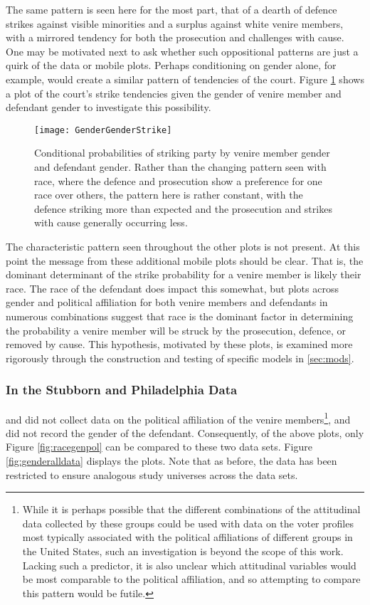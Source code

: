 The same pattern is seen here for the most part, that of a dearth of defence strikes against visible minorities and a surplus
against white venire members, with a mirrored tendency for both the prosecution and challenges with cause. One may be motivated
next to ask whether such oppositional patterns are just a quirk of the data or mobile plots. Perhaps conditioning on gender
alone, for example, would create a similar pattern of tendencies of the court. Figure \ref{fig:gengen} shows a plot of the court's
strike tendencies given the gender of venire member and defendant gender to investigate this possibility.

\begin{figure}[h!]
  \centering
  \texttt{[image: GenderGenderStrike]}
  \caption[Strikes by Gender and Defendant Gender (Sunshine)]
  {\footnotesize Conditional probabilities of striking party by venire member gender and defendant gender. Rather than the changing
    pattern seen with race, where the defence and prosecution show a preference for one race over others, the pattern here is
    rather constant, with the defence striking more than expected and
    the prosecution and strikes with cause generally occurring
    less.} \label{fig:gengen}
\end{figure}

The characteristic pattern seen throughout the other plots is not present. At this point the message from these additional mobile
plots should be clear. That is, the dominant determinant of the strike probability for a venire member is likely their race. The
race of the defendant does impact this somewhat, but plots across gender and political affiliation for both venire members and
defendants in numerous combinations suggest that race is the dominant factor in determining the probability a venire member will
be struck by the prosecution, defence, or removed by cause. This hypothesis, motivated by these plots, is examined more rigorously
through the construction and testing of specific models in \ref{sec:mods}.

\subsubsection{In the Stubborn and Philadelphia Data}

\cite{StubbornLegacy} and \cite{PerempChalMurder} did not collect data on the political affiliation of the venire
members\footnote{While it is perhaps possible that the different combinations of the attitudinal data collected by these groups
  could be used with data on the voter profiles most typically associated with the political affiliations of different groups in
  the United States, such an investigation is beyond the scope of this work. Lacking such a predictor, it is also unclear which
  attitudinal variables would be most comparable to the political affiliation, and so attempting to compare this pattern would be
  futile.}, and \cite{StubbornLegacy} did not record the gender of the defendant. Consequently, of the above plots, only Figure
\ref{fig:racegenpol} can be compared to these two data sets. Figure \ref{fig:genderalldata} displays the plots. Note that as
before, the data has been restricted to ensure analogous study universes across the data sets.

